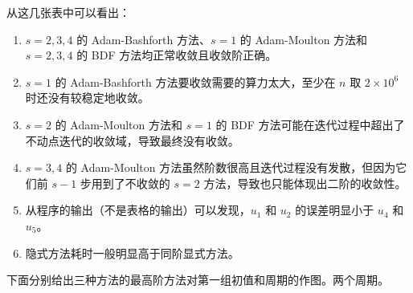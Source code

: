 \documentclass{ctexart}
\begin{document}
\begin{table}\centering
	\caption{BDF方法的误差和效率}
\end{table}

从这几张表中可以看出：
\begin{enumerate}
	\item $s=2,3,4$ 的 Adam-Bashforth 方法、$s=1$ 的 Adam-Moulton 方法和 $s=2,3,4$ 的 BDF 方法均正常收敛且收敛阶正确。
	\item $s=1$ 的 Adam-Bashforth 方法要收敛需要的算力太大，至少在 $n$ 取 $2\times 10^6$ 时还没有较稳定地收敛。
	\item $s=2$ 的 Adam-Moulton 方法和 $s=1$ 的 BDF 方法可能在迭代过程中超出了不动点迭代的收敛域，导致最终没有收敛。
	\item $s=3,4$ 的 Adam-Moulton 方法虽然阶数很高且迭代过程没有发散，但因为它们前 $s-1$ 步用到了不收敛的 $s=2$ 方法，导致也只能体现出二阶的收敛性。
	\item 从程序的输出（不是表格的输出）可以发现，$u_1$ 和 $u_2$ 的误差明显小于 $u_4$ 和 $u_5$。
	\item 隐式方法耗时一般明显高于同阶显式方法。
\end{enumerate}

下面分别给出三种方法的最高阶方法对第一组初值和周期的作图。两个周期。
\end{document}
